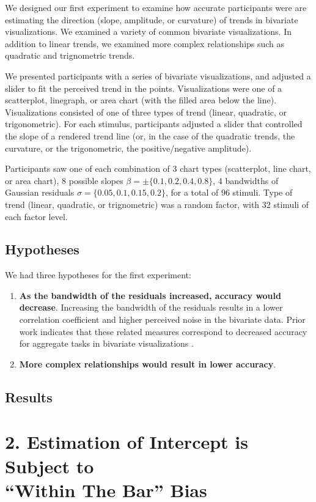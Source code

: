 \documentclass{sigchi}
\begin{document}
We designed our first experiment to examine how accurate participants were are estimating the direction (slope, amplitude, or curvature) of trends in bivariate visualizations. We examined a variety of common bivariate visualizations. In addition to linear trends, we examined more complex relationships such as quadratic and trignometric trends.

We presented participants with a series of bivariate visualizations, and adjusted a slider to fit the perceived trend in the points. Visualizations were one of a scatterplot, linegraph, or area chart (with the filled area below the line). Visualizations consisted of one of three types of trend (linear, quadratic, or trigonometric). For each stimulus, participants adjusted a slider that controlled the slope of a rendered trend line (or, in the case of the quadratic trends, the curvature, or the trigonometric, the positive/negative amplitude). 

Participants saw one of each combination of 3 chart types (scatterplot, line chart, or area chart), 8 possible slopes $\beta = \pm \{0.1,0.2,0.4,0.8\}$, 4 bandwidths of Gaussian residuals $\sigma = \{0.05,0.1,0.15,0.2\}$, for a total of 96 stimuli. Type of trend (linear, quadratic, or trignometric) was a random factor, with 32 stimuli of each factor level.

\subsection{Hypotheses}

We had three hypotheses for the first experiment:
\begin{enumerate}
	\item \textbf{As the bandwidth of the residuals increased, accuracy would decrease}. Increasing the bandwidth of the residuals results in a lower correlation coefficient and higher perceived noise in the bivariate data. Prior work indicates that these related measures correspond to decreased accuracy for aggregate tasks in bivariate visualizations \cite{albers2014task,harrison2014ranking}. 
	\item \textbf{More complex relationships would result in lower accuracy}. 
\end{enumerate}
\subsection{Results}

\section{2. Estimation of Intercept is Subject to \\ ``Within The Bar'' Bias}
\end{document}
